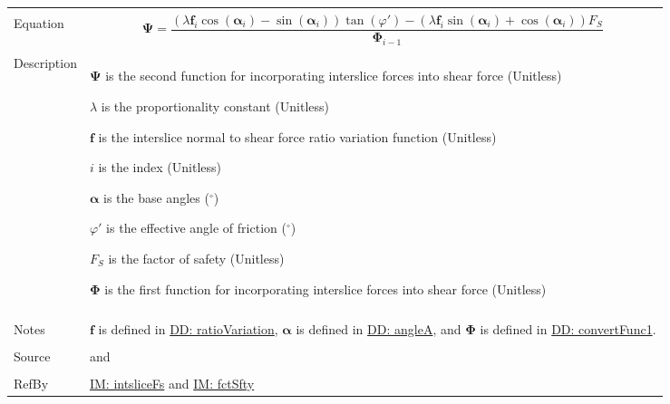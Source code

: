 \documentclass[12pt]{article}
\begin{document}
\begin{minipage}{\textwidth}
\begin{tabular}{>{\raggedright}p{}>{\raggedright\arraybackslash}p{}}
\\ \midrule \\
Equation & \begin{displaymath}
           \mathbf{Ψ}=\frac{\left(λ {\mathbf{f}}_{i} \cos\left({\mathbf{α}}_{i}\right)-\sin\left({\mathbf{α}}_{i}\right)\right) \tan\left(φ'\right)-\left(λ {\mathbf{f}}_{i} \sin\left({\mathbf{α}}_{i}\right)+\cos\left({\mathbf{α}}_{i}\right)\right) {F_{S}}}{{\mathbf{Φ}}_{i-1}}
           \end{displaymath}
\\ \midrule \\
Description & \begin{symbDescription}
              \item{$\mathbf{Ψ}$ is the second function for incorporating interslice forces into shear force (Unitless)}
              \item{$λ$ is the proportionality constant (Unitless)}
              \item{$\mathbf{f}$ is the interslice normal to shear force ratio variation function (Unitless)}
              \item{$i$ is the index (Unitless)}
              \item{$\mathbf{α}$ is the base angles (${}^{\circ}$)}
              \item{$φ'$ is the effective angle of friction (${}^{\circ}$)}
              \item{${F_{S}}$ is the factor of safety (Unitless)}
              \item{$\mathbf{Φ}$ is the first function for incorporating interslice forces into shear force (Unitless)}
              \end{symbDescription}
\\ \midrule \\
Notes & $\mathbf{f}$ is defined in \hyperref[DD:ratioVariation]{DD: ratioVariation}, $\mathbf{α}$ is defined in \hyperref[DD:angleA]{DD: angleA}, and $\mathbf{Φ}$ is defined in \hyperref[DD:convertFunc1]{DD: convertFunc1}.
        
\\ \midrule \\
Source & \cite{chen2005} and \cite{karchewski2012}
         
\\ \midrule \\
RefBy & \hyperref[IM:intsliceFs]{IM: intsliceFs} and \hyperref[IM:fctSfty]{IM: fctSfty}
        
\\ \bottomrule
\end{tabular}
\end{minipage}
\end{document}
